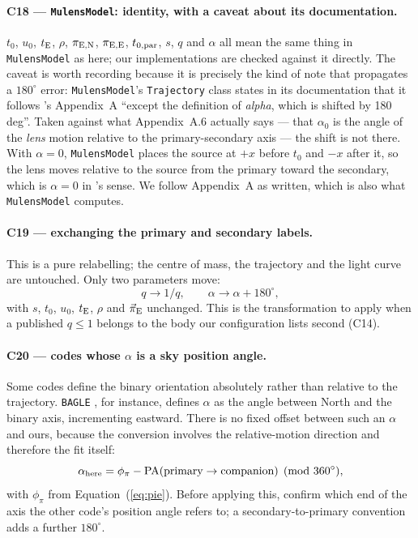 \paragraph{C18 --- \texttt{MulensModel}: identity, with a caveat about its
documentation.}  $t_0$, $u_0$, $t_{\rm E}$, $\rho$, $\pi_{\rm E,N}$,
$\pi_{\rm E,E}$, $t_{0,\rm par}$, $s$, $q$ and $\alpha$ all mean the same
thing in \texttt{MulensModel} \citep{Poleski:2019} as here; our
implementations are checked against it directly.  The caveat is worth
recording because it is precisely the kind of note that propagates a
$180^\circ$ error: \texttt{MulensModel}'s \texttt{Trajectory} class states
in its documentation that it follows \citeauthor{Skowron:2011}'s
Appendix~A ``except the definition of \emph{alpha}, which is shifted by
180 deg''.  Taken against what Appendix~A.6 actually says --- that
$\alpha_0$ is the angle of the \emph{lens} motion relative to the
primary-secondary axis --- the shift is not there.  With $\alpha = 0$,
\texttt{MulensModel} places the source at $+x$ before $t_0$ and $-x$ after
it, so the lens moves relative to the source from the primary toward the
secondary, which is $\alpha = 0$ in \citeauthor{Skowron:2011}'s sense.  We
follow Appendix~A as written, which is also what \texttt{MulensModel}
computes.

\paragraph{C19 --- exchanging the primary and secondary labels.}  This is a
pure relabelling; the centre of mass, the trajectory and the light curve are
untouched.  Only two parameters move:
\begin{equation}
  q \rightarrow 1/q,
  \qquad
  \alpha \rightarrow \alpha + 180^\circ,
\end{equation}
with $s$, $t_0$, $u_0$, $t_{\rm E}$, $\rho$ and $\vec{\pi}_{\rm E}$
unchanged.  This is the transformation to apply when a published $q \le 1$
belongs to the body our configuration lists second (C14).

\paragraph{C20 --- codes whose $\alpha$ is a sky position angle.}  Some
codes define the binary orientation absolutely rather than relative to the
trajectory.  \texttt{BAGLE} \citep{Bhadra:2026}, for instance, defines
$\alpha$ as the angle between North and the binary axis, incrementing
eastward.  There is no fixed offset between such an $\alpha$ and ours,
because the conversion involves the relative-motion direction and therefore
the fit itself:
\begin{equation}
  \alpha_{\rm here} = \phi_\pi - {\rm PA}(\textrm{primary}
    \rightarrow \textrm{companion}) \pmod{360^\circ},
\end{equation}
with $\phi_\pi$ from Equation~(\ref{eq:pie}).  Before applying this, confirm
which end of the axis the other code's position angle refers to; a
secondary-to-primary convention adds a further $180^\circ$.

